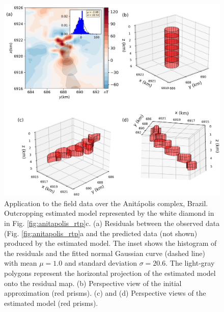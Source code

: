 \begin{figure}
    \centering
    \includegraphics[width=\linewidth]{figures/real_results_white_diamond.png}
    \caption{Application to the field data over the Anit{\'a}polis complex, Brazil.
    Outcropping estimated model  represented by the white diamond in in Fig.    		   \ref{fig:anitapolis_rtp}c. 
    (a) Residuals between the observed data (Fig. \ref{fig:anitapolis_rtp}a and the 
    predicted data (not shown) produced by the estimated model. 
    The inset shows the histogram of the residuals and the fitted normal 
    Gaussian curve (dashed line) with mean $\mu = 1.0$ and standard deviation  
    $\sigma = 20.6$.
    The light-gray polygons represent the horizontal projection of the estimated 
    model onto the residual map. 
    (b) Perspective view of the initial approximation (red prisms). 
    (c) and (d) Perspective views of the estimated model (red prisms).}
    \label{fig:real_result}
\end{figure}